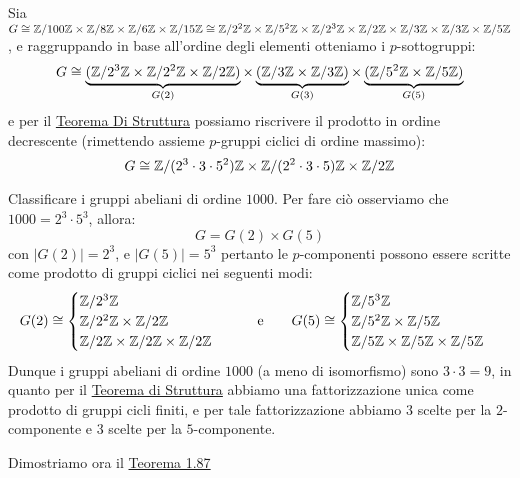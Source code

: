 \documentclass[11pt]{scrartcl}
\begin{document}
\begin{example}
    Sia $G \cong \mathbb{Z}/{100}\mathbb{Z} \times \mathbb{Z}/{8}\mathbb{Z} \times \mathbb{Z}/{6}\mathbb{Z} \times \mathbb{Z}/{15}\mathbb{Z} \cong \mathbb{Z}/{2^2}\mathbb{Z} \times \mathbb{Z}/{5^2}\mathbb{Z} \times \mathbb{Z}/{2^3}\mathbb{Z} \times \mathbb{Z}/{2}\mathbb{Z} \times \mathbb{Z}/{3}\mathbb{Z} \times \mathbb{Z}/{3}\mathbb{Z} \times \mathbb{Z}/{5}\mathbb{Z}$, e raggruppando in base all'ordine degli elementi
    otteniamo i $p$-sottogruppi:
        \[ G \cong \underbrace{(\mathbb{Z}/{2^3}\mathbb{Z} \times \mathbb{Z}/{2^2}\mathbb{Z} \times \mathbb{Z}/{2}\mathbb{Z})}_{G(2)} \times \underbrace{(\mathbb{Z}/{3}\mathbb{Z} \times \mathbb{Z}/{3}\mathbb{Z})}_{G(3)} \times \underbrace{(\mathbb{Z}/{5^2}\mathbb{Z} \times \mathbb{Z}/{5}\mathbb{Z})}_{G(5)}
            \]
    e per il \hyperref[t:struttura]{Teorema Di Struttura} possiamo riscrivere il prodotto in ordine decrescente (rimettendo assieme $p$-gruppi ciclici di ordine massimo):
        \[ G \cong \mathbb{Z}/{(2^3\cdot 3 \cdot 5^2)}\mathbb{Z} \times \mathbb{Z}/{(2^2 \cdot 3 \cdot 5)}\mathbb{Z} \times \mathbb{Z}/{2}\mathbb{Z}
            \]
\end{example}

\begin{example}
    Classificare i gruppi abeliani di ordine $1000$. Per fare ciò osserviamo che $1000 = 2^3 \cdot 5^3$, allora:
    \[  G = G(2) \times G(5)
        \]
    con $|G(2)| = 2^3$, e $|G(5)| = 5^3$ pertanto le $p$-componenti possono essere scritte come prodotto di gruppi ciclici nei seguenti modi:
    \[ G(2) \cong \begin{cases}
                    \mathbb{Z}/{2^3}\mathbb{Z} \\
                    \mathbb{Z}/{2^2}\mathbb{Z} \times \mathbb{Z}/{2}\mathbb{Z} \\
                    \mathbb{Z}/{2}\mathbb{Z} \times \mathbb{Z}/{2}\mathbb{Z} \times \mathbb{Z}/{2}\mathbb{Z}
                \end{cases}
    \qquad \text e \qquad
    G(5) \cong \begin{cases}
        \mathbb{Z}/{5^3}\mathbb{Z} \\
        \mathbb{Z}/{5^2}\mathbb{Z} \times \mathbb{Z}/{5}\mathbb{Z} \\
        \mathbb{Z}/{5}\mathbb{Z} \times \mathbb{Z}/{5}\mathbb{Z} \times \mathbb{Z}/{5}\mathbb{Z}
    \end{cases}
        \]
    Dunque i gruppi abeliani di ordine $1000$ (a meno di isomorfismo) sono $3\cdot 3 = 9$, in quanto per il \hyperref[t:struttura]{Teorema di Struttura} abbiamo
    una fattorizzazione unica come prodotto di gruppi cicli finiti, e per tale fattorizzazione abbiamo $3$ scelte per la $2$-componente e $3$ scelte per la $5$-componente.
\end{example}

Dimostriamo ora il \hyperref[t:t1]{Teorema 1.87}
\end{document}
